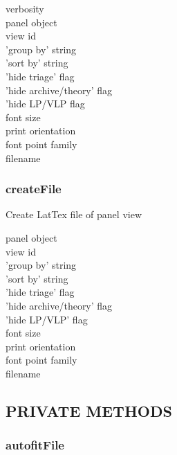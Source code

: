 \documentclass{article}
\begin{document}
\begin{description}

\item[{verbosity}] \mbox{}
\item[{panel object}] \mbox{}
\item[{view id}] \mbox{}
\item[{'group by' string}] \mbox{}
\item[{'sort by' string}] \mbox{}
\item[{'hide triage' flag}] \mbox{}
\item[{'hide archive/theory' flag}] \mbox{}
\item[{'hide LP/VLP flag}] \mbox{}
\item[{font size}] \mbox{}
\item[{print orientation}] \mbox{}
\item[{font point family}] \mbox{}
\item[{filename}] \mbox{}\end{description}
\subsubsection*{createFile\label{Print_createFile}}


Create LatTex file of panel view

\begin{description}

\item[{panel object}] \mbox{}
\item[{view id}] \mbox{}
\item[{'group by' string}] \mbox{}
\item[{'sort by' string}] \mbox{}
\item[{'hide triage' flag}] \mbox{}
\item[{'hide archive/theory' flag}] \mbox{}
\item[{'hide LP/VLP' flag}] \mbox{}
\item[{font size}] \mbox{}
\item[{print orientation}] \mbox{}
\item[{font point family}] \mbox{}
\item[{filename}] \mbox{}\end{description}
\subsection*{PRIVATE METHODS\label{Print_PRIVATE_METHODS}}
\subsubsection*{autofitFile\label{Print_autofitFile}}
\end{document}
